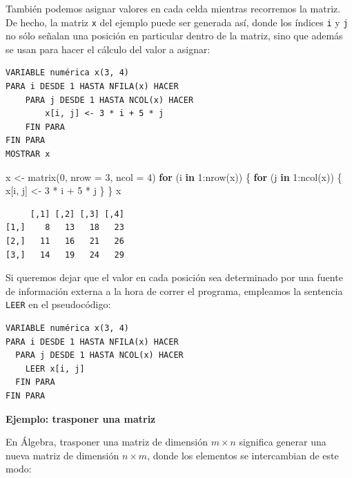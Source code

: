 \documentclass[
]{book}
\newenvironment{Shaded}{\begin{snugshade}}{\end{snugshade}}
\newcommand{\AttributeTok}[1]{\textcolor[rgb]{0.77,0.63,0.00}{#1}}
\newcommand{\ControlFlowTok}[1]{\textcolor[rgb]{0.13,0.29,0.53}{\textbf{#1}}}
\newcommand{\DecValTok}[1]{\textcolor[rgb]{0.00,0.00,0.81}{#1}}
\newcommand{\FunctionTok}[1]{\textcolor[rgb]{0.00,0.00,0.00}{#1}}
\newcommand{\NormalTok}[1]{#1}
\newcommand{\OtherTok}[1]{\textcolor[rgb]{0.56,0.35,0.01}{#1}}
\newcommand{\SpecialCharTok}[1]{\textcolor[rgb]{0.00,0.00,0.00}{#1}}
\begin{document}
También podemos asignar valores en cada celda mientras recorremos la matriz. De hecho, la matriz \texttt{x} del ejemplo puede ser generada así, donde los índices \texttt{i} y \texttt{j} no sólo señalan una posición en particular dentro de la matriz, sino que además se usan para hacer el cálculo del valor a asignar:

\begin{verbatim}
VARIABLE numérica x(3, 4)
PARA i DESDE 1 HASTA NFILA(x) HACER
    PARA j DESDE 1 HASTA NCOL(x) HACER
        x[i, j] <- 3 * i + 5 * j
    FIN PARA
FIN PARA
MOSTRAR x
\end{verbatim}

\begin{Shaded}
\begin{Highlighting}[]
\NormalTok{x }\OtherTok{\textless{}{-}} \FunctionTok{matrix}\NormalTok{(}\DecValTok{0}\NormalTok{, }\AttributeTok{nrow =} \DecValTok{3}\NormalTok{, }\AttributeTok{ncol =} \DecValTok{4}\NormalTok{)}
\ControlFlowTok{for}\NormalTok{ (i }\ControlFlowTok{in} \DecValTok{1}\SpecialCharTok{:}\FunctionTok{nrow}\NormalTok{(x)) \{}
    \ControlFlowTok{for}\NormalTok{ (j }\ControlFlowTok{in} \DecValTok{1}\SpecialCharTok{:}\FunctionTok{ncol}\NormalTok{(x)) \{}
\NormalTok{        x[i, j] }\OtherTok{\textless{}{-}} \DecValTok{3} \SpecialCharTok{*}\NormalTok{ i }\SpecialCharTok{+} \DecValTok{5} \SpecialCharTok{*}\NormalTok{ j}
\NormalTok{    \}}
\NormalTok{\}}
\NormalTok{x}
\end{Highlighting}
\end{Shaded}

\begin{verbatim}
     [,1] [,2] [,3] [,4]
[1,]    8   13   18   23
[2,]   11   16   21   26
[3,]   14   19   24   29
\end{verbatim}

Si queremos dejar que el valor en cada posición sea determinado por una fuente de información externa a la hora de correr el programa, empleamos la sentencia \texttt{LEER} en el pseudocódigo:

\begin{verbatim}
VARIABLE numérica x(3, 4)
PARA i DESDE 1 HASTA NFILA(x) HACER
  PARA j DESDE 1 HASTA NCOL(x) HACER
    LEER x[i, j]
  FIN PARA
FIN PARA
\end{verbatim}

\textbf{Ejemplo: trasponer una matriz}

En Álgebra, trasponer una matriz de dimensión \(m \times n\) significa generar una nueva matriz de dimensión \(n \times m\), donde los elementos se intercambian de este modo:
\end{document}
